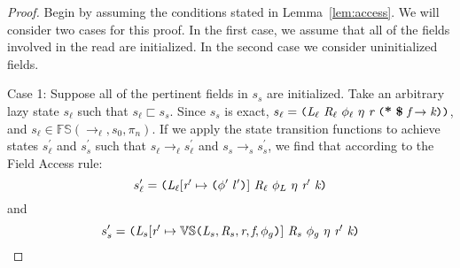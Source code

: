 \begin{proof}
Begin by assuming the conditions stated in Lemma~\ref{lem:access}. We will consider two cases for this proof. In the first case, we assume that all of the fields involved in the read are initialized. In the second case we consider uninitialized fields. 

Case 1: Suppose all of the pertinent fields in $s_s$ are initialized. Take an arbitrary lazy state $s_\ell$ such that $s_\ell \sqsubset s_s$. Since $s_s$ is exact,  $s_\ell = \lp \cfgnt{L}_{\ell}\ \cfgnt{R}_{\ell}\ \phi_\ell\ \eta\ \cfgnt{r}\ \lp \cfgt{*}\ \cfgt{\$}\ \cfgnt{f} \rightarrow \cfgnt{k} \rp \rp$, and $s_\ell \in \mathbb{FS}(\rightarrow_{\ell},s_0,\pi_n)$. If we apply the state transition functions to achieve states $s_\ell^\prime$ and $s_s^\prime$ such that $s_\ell \rightarrow_\ell s_\ell^\prime$ and  $s_s \rightarrow_s s_s^\prime$, we find that according to the Field Access rule:
$$s_\ell^\prime = \lp \cfgnt{L}_{\ell} [\cfgnt{r}^\prime \mapsto \lp\phi^\prime\ l^\prime\rp]\ \cfgnt{R}_{\ell}\ \phi_L\ \eta\ \cfgnt{r}^\prime\ \cfgnt{k}\rp $$
 and 
 $$ s_s^\prime = \lp \cfgnt{L}_{s}[\cfgnt{r}^\prime \mapsto \mathbb{VS}\lp \cfgnt{L}_{s},\cfgnt{R}_{s},\cfgnt{r},\cfgnt{f},\phi_g\rp ]\ \cfgnt{R}_{s}\ \phi_g\ \eta\ \cfgnt{r}^\prime\ \cfgnt{k}\rp $$


\end{proof}
